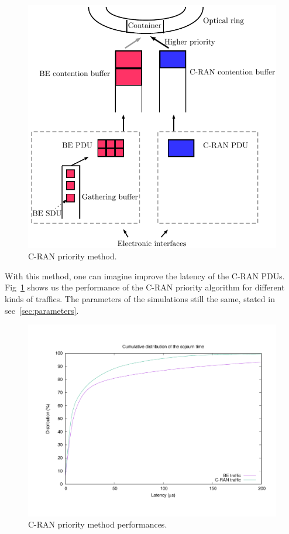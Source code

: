 \documentclass[]{algotel}
\begin{document}
    \begin{figure}[h]
\begin{center}   
      \includegraphics[scale=0.7]{cranprio.pdf}
     \caption{C-RAN priority method.}
\end{center}
  \end{figure}
  
  With this method, one can imagine improve the latency of the C-RAN PDUs. Fig~\ref{fig:prior} shows us the performance of the C-RAN priority algorithm for different kinds of traffics. The parameters of the simulations still the same, stated in sec~\ref{sec:parameters}.
      \begin{figure}[h]
      \label{fig:prior}
\begin{center}   

      \includegraphics[scale=0.4]{prior.pdf}

     \caption{C-RAN priority method performances.}
\end{center}
  \end{figure}
  
\end{document}
